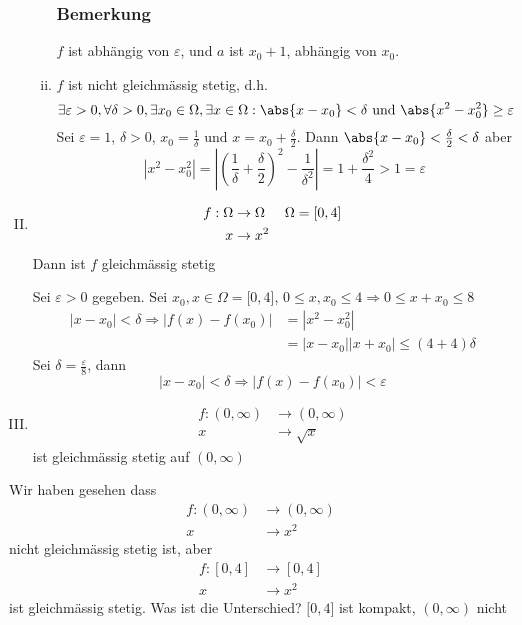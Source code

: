 \begin{enumerate}[I)]
\begin{enumerate}[i)]
\subsubsection*{Bemerkung}
$f$ ist abhängig von $\varepsilon$, und $a$ ist $x_0+1$, abhängig von $x_0$.
\item $f$ ist nicht gleichmässig stetig, d.h. \[\exists \varepsilon  > 0, \forall\delta>0, \exists x_0\in\Omega, \exists x\in\Omega:\abs{x-x_0}<\delta \text{ und }\abs{x^2-x_0^2}\geq \varepsilon\]
Sei $\varepsilon=1$, $\delta>0$, $x_0=\frac{1}{\delta}$ und $x=x_0+\frac{\delta}{2}$. Dann $\abs{x-x_0}<\frac{\delta}{2}<\delta$ aber \[\left| {{x^2} - x_0^2} \right| = \left| {{{\left( {\frac{1}{\delta } + \frac{\delta }{2}} \right)}^2} - \frac{1}{{{\delta ^2}}}} \right| = 1 + \frac{{{\delta ^2}}}{4} > 1 = \varepsilon \]
\end{enumerate}
\item \begin{align*}
f:\Omega&\to\Omega\hspace{5mm}\Omega=\lbrack 0,4\rbrack\\
x&\to x^2
\end{align*}
Dann ist $f$ gleichmässig stetig
\begin{beweis}{}
Sei $\varepsilon>0$ gegeben. Sei $x_0,x\in\Omega=\lbrack 0,4\rbrack$, $0\leq x,x_0\leq 4\Rightarrow 0\leq x+x_0\leq 8$
\begin{align*}
\left| {x - {x_0}} \right| < \delta  \Rightarrow \left| {f\left( x \right) - f\left( {{x_0}} \right)} \right| &= \left| {{x^2} - x_0^2} \right|\\
 &= \left| {x - {x_0}} \right|\left| {x + {x_0}} \right| \le \left( {4 + 4} \right)\delta 
\end{align*}
Sei $\delta=\frac{\varepsilon}{8}$, dann 
\[\left| {x - {x_0}} \right| < \delta  \Rightarrow \left| {f\left( x \right) - f\left( {{x_0}} \right)} \right| < \varepsilon \]
\end{beweis}
\item  \begin{align*}
f:\left( 0,\infty\right)&\to\left( 0,\infty\right)\\
x&\to \sqrt{x}
\end{align*}
ist gleichmässig stetig auf $\left( 0,\infty\right)$
\begin{beweis}{}
\end{beweis}
\end{enumerate}

Wir haben gesehen dass 
 \begin{align*}
f:\left( 0,\infty\right)&\to\left( 0,\infty\right)\\
x&\to x^2
\end{align*}
nicht gleichmässig stetig ist, aber 
 \begin{align*}
f:\left[ 0,4\right]&\to\left[ 0,4\right]\\
x&\to x^2
\end{align*}
ist gleichmässig stetig. Was ist die Unterschied? $\lbrack 0,4\rbrack$ ist kompakt, $\left( 0,\infty\right)$ nicht

